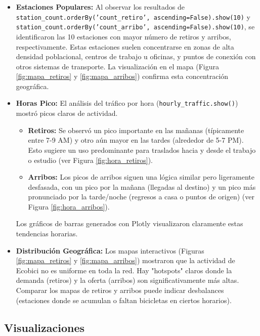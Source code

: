 \documentclass[12pt]{article}
\begin{document}
    \begin{itemize}
        \item \textbf{Estaciones Populares:} Al observar los resultados de \texttt{station\_count.orderBy('count\_retiro', ascending=False).show(10)} y \texttt{station\_count.orderBy('count\_arribo', ascending=False).show(10)}, se identificaron las 10 estaciones con mayor número de retiros y arribos, respectivamente. Estas estaciones suelen concentrarse en zonas de alta densidad poblacional, centros de trabajo u oficinas, y puntos de conexión con otros sistemas de transporte. La visualización en el mapa (Figura \ref{fig:mapa_retiros} y \ref{fig:mapa_arribos}) confirma esta concentración geográfica.
        \item \textbf{Horas Pico:} El análisis del tráfico por hora (\texttt{hourly\_traffic.show()}) mostró picos claros de actividad.
            \begin{itemize}
                \item \textbf{Retiros:} Se observó un pico importante en las mañanas (típicamente entre 7-9 AM) y otro aún mayor en las tardes (alrededor de 5-7 PM). Esto sugiere un uso predominante para traslados hacia y desde el trabajo o estudio (ver Figura \ref{fig:hora_retiros}).
                \item \textbf{Arribos:} Los picos de arribos siguen una lógica similar pero ligeramente desfasada, con un pico por la mañana (llegadas al destino) y un pico más pronunciado por la tarde/noche (regresos a casa o puntos de origen) (ver Figura \ref{fig:hora_arribos}).
            \end{itemize}
            Los gráficos de barras generados con Plotly visualizaron claramente estas tendencias horarias.
        \item \textbf{Distribución Geográfica:} Los mapas interactivos (Figuras \ref{fig:mapa_retiros} y \ref{fig:mapa_arribos}) mostraron que la actividad de Ecobici no es uniforme en toda la red. Hay "hotspots" claros donde la demanda (retiros) y la oferta (arribos) son significativamente más altas. Comparar los mapas de retiros y arribos puede indicar desbalances (estaciones donde se acumulan o faltan bicicletas en ciertos horarios).
    \end{itemize}

    \subsection{Visualizaciones}
\end{document}
